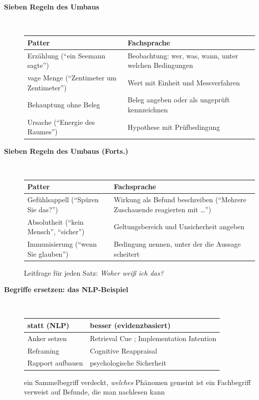 \begin{description}
\item[{\rot\bf Sieben Regeln des Umbaus}]~\\[-\lblskip]
\begin{center}\nsl{\small}
\begin{tabular}{p{}p{}}
\toprule
\textbf{Patter} & \textbf{Fachsprache} \\
\midrule
Erzählung (\enquote{ein Seemann sagte}) & Beobachtung: wer, was, wann, unter welchen Bedingungen \\
vage Menge (\enquote{Zentimeter um Zentimeter}) & Wert mit Einheit und Messverfahren \\
Behauptung ohne Beleg & Beleg angeben oder als ungeprüft kennzeichnen \\
Ursache (\enquote{Energie des Raumes}) & Hypothese mit Prüfbedingung \\
\bottomrule
\end{tabular}
\end{center}
\os{\newpage}

\item[{\rot\bf Sieben Regeln des Umbaus (Forts.)}]~\\[-\lblskip]
\begin{center}\nsl{\small}
\begin{tabular}{p{}p{}}
\toprule
\textbf{Patter} & \textbf{Fachsprache} \\
\midrule
Gefühlsappell (\enquote{Spüren Sie das?}) & Wirkung als Befund beschreiben (\enquote{Mehrere Zuschauende reagierten mit \ldots}) \\
Absolutheit (\enquote{kein Mensch}, \enquote{sicher}) & Geltungsbereich und Unsicherheit angeben \\
Immunisierung (\enquote{wenn Sie glauben}) & Bedingung nennen, unter der die Aussage scheitert \\
\bottomrule
\end{tabular}
\end{center}
\bi
  \ite Leitfrage für jeden Satz: \emph{Woher weiß ich das?}
\ei
\os{\newpage}

\item[{\rot\bf Begriffe ersetzen: das NLP-Beispiel}]~\\[-\lblskip]
\begin{center}\nsl{\small}
\begin{tabular}{p{}p{}}
\toprule
\textbf{statt (NLP)} & \textbf{besser (evidenzbasiert)} \\
\midrule
Anker setzen & Retrieval Cue \parencite{godden1975}; Implementation Intention \parencite{gollwitzer2006} \\
Reframing & Cognitive Reappraisal \parencite{gross1998} \\
Rapport aufbauen & psychologische Sicherheit \parencite{edmondson1999} \\
\bottomrule
\end{tabular}
\end{center}
\bi
  \ite ein Sammelbegriff verdeckt, \emph{welches} Phänomen gemeint ist
  \ite ein Fachbegriff verweist auf Befunde, die man nachlesen kann
\ei
\os{\newpage}
\end{description}

